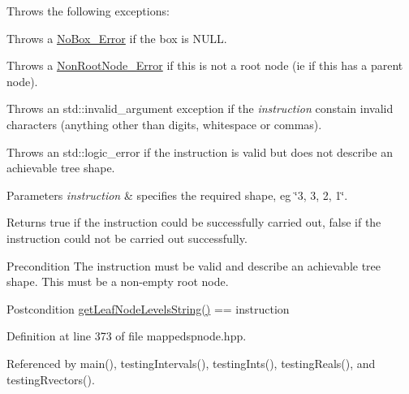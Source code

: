 \-Throws the following exceptions\-: 
\begin{DoxyItemize}
\item \-Throws a \hyperlink{classsubpavings_1_1NoBox__Error}{\-No\-Box\-\_\-\-Error} if the box is \-N\-U\-L\-L. 
\item \-Throws a \hyperlink{classsubpavings_1_1NonRootNode__Error}{\-Non\-Root\-Node\-\_\-\-Error} if this is not a root node (ie if this has a parent node). 
\item \-Throws an std\-::invalid\-\_\-argument exception if the {\itshape instruction\/} constain invalid characters (anything other than digits, whitespace or commas). 
\item \-Throws an std\-::logic\-\_\-error if the instruction is valid but does not describe an achievable tree shape. 
\end{DoxyItemize}


\begin{DoxyParams}{\-Parameters}
{\em instruction} & specifies the required shape, eg \char`\"{}3, 3, 2, 1\char`\"{}. \\
\hline
\end{DoxyParams}
\begin{DoxyReturn}{\-Returns}
true if the instruction could be successfully carried out, false if the instruction could not be carried out successfully. 
\end{DoxyReturn}
\begin{DoxyPrecond}{\-Precondition}
\-The instruction must be valid and describe an achievable tree shape. \-This must be a non-\/empty root node. 
\end{DoxyPrecond}
\begin{DoxyPostcond}{\-Postcondition}
\hyperlink{classsubpavings_1_1SPnode_a7ea8cd3649cbf13d5743d3cb23315d72}{get\-Leaf\-Node\-Levels\-String()} == instruction 
\end{DoxyPostcond}


\-Definition at line 373 of file mappedspnode.\-hpp.



\-Referenced by main(), testing\-Intervals(), testing\-Ints(), testing\-Reals(), and testing\-Rvectors().


